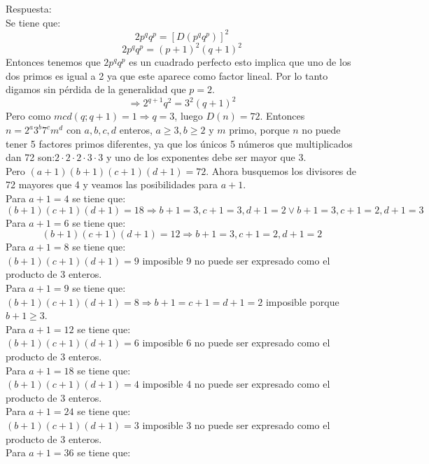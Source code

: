 \documentclass{book}
\begin{document}
\begin{enumerate}
\begin{enumerate}
          \end{enumerate}
          Respuesta:\\
          Se tiene que:
          $$2p^qq^p = {[D(p^qq^p)]}^2$$
          $$2 p^qq^p = {(p + 1)}^2{(q + 1)}^2$$
          Entonces tenemos que $2 p^qq^p$ es un cuadrado perfecto esto implica que uno de los dos primos es igual a 2 ya que este aparece como factor lineal. Por lo tanto digamos sin pérdida de la generalidad que $p= 2$.
          $$\Rightarrow 2^{q+1}q^2 = 3^2(q + 1)^2$$
          Pero como $mcd(q;q + 1) = 1 \Rightarrow q = 3$, luego $D(n) = 72$. Entonces $n = 2^a3^b7^cm^d$ con $a,b,c,d$ enteros, $a \geq 3 ,b\geq  2$ y $m$ primo, porque $n$ no puede tener 5 factores primos diferentes, ya que los únicos 5 números que multiplicados dan 72 son:$2\cdot 2\cdot 2\cdot 3\cdot 3$ y uno de los exponentes debe ser mayor que 3. \\
          Pero $(a + 1)(b + 1)(c + 1)(d + 1) = 72$. Ahora busquemos los divisores de 72 mayores que 4 y veamos las posibilidades para $a + 1$.\\
          Para $a + 1 = 4$ se tiene que:
          $$(b + 1)(c + 1)(d + 1) = 18 \Rightarrow b + 1 = 3,c + 1 = 3,d + 1 = 2
              \vee  b + 1 = 3,c + 1 = 2,d + 1 = 3$$
          Para $a + 1 = 6$ se tiene que:
          $$(b + 1)(c + 1)(d + 1) = 12 \Rightarrow b + 1 = 3,c + 1 = 2,d + 1 = 2$$
          Para $a + 1 = 8$ se tiene que:\\
          $(b + 1)(c + 1)(d + 1) = 9$ imposible 9 no puede ser expresado como el producto de 3 enteros.\\
          Para $a + 1 = 9$ se tiene que: \\
          $(b + 1)(c + 1)(d + 1) = 8 \Rightarrow b + 1 = c + 1 = d + 1 = 2$  imposible porque $b + 1 \geq 3$. \\
          Para $a + 1 = 12$ se tiene que: \\
          $(b + 1)(c + 1)(d + 1) = 6$ imposible 6 no puede ser expresado como el producto de 3 enteros. \\
          Para $a + 1 = 18$ se tiene que: \\
          $(b + 1)(c + 1)(d + 1) = 4$ imposible 4 no puede ser expresado como el producto de 3 enteros.\\
          Para $a + 1 = 24$ se tiene que: \\
          $(b + 1)(c + 1)(d + 1) = 3$ imposible 3 no puede ser expresado como el producto de 3 enteros.\\
          Para $a + 1 = 36$ se tiene que: \\

\end{enumerate}
\end{document}
